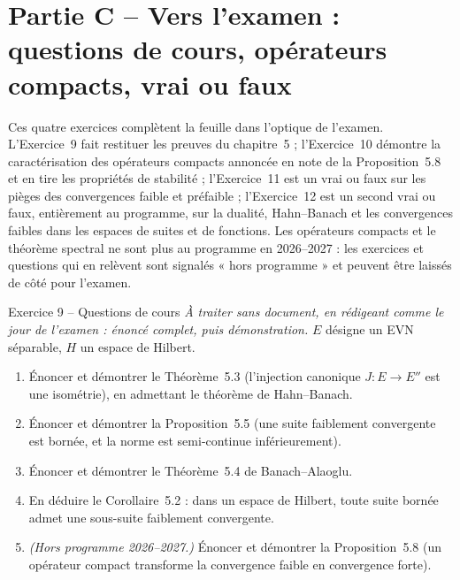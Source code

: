 \documentclass[11pt,a4paper]{article}
\theoremstyle{definition}
\begin{document}
\section*{Partie C -- Vers l'examen : questions de cours, opérateurs compacts, vrai ou faux}

\begin{commentaire}
Ces quatre exercices complètent la feuille dans l'optique de l'examen. L'Exercice~9 fait restituer les preuves du chapitre~5 ; l'Exercice~10 démontre la caractérisation des opérateurs compacts annoncée en note de la Proposition~5.8 et en tire les propriétés de stabilité ; l'Exercice~11 est un vrai ou faux sur les pièges des convergences faible et préfaible ; l'Exercice~12 est un second vrai ou faux, entièrement au programme, sur la dualité, Hahn--Banach et les convergences faibles dans les espaces de suites et de fonctions. Les opérateurs compacts et le théorème spectral ne sont plus au programme en 2026--2027 : les exercices et questions qui en relèvent sont signalés « hors programme » et peuvent être laissés de côté pour l'examen.
\end{commentaire}

\begin{exo}{Exercice 9 -- Questions de cours}
\emph{À traiter sans document, en rédigeant comme le jour de l'examen : énoncé complet, puis démonstration.} $E$ désigne un EVN séparable, $H$ un espace de Hilbert.
\begin{enumerate}[label=(\alph*)]
  \item Énoncer et démontrer le Théorème~5.3 (l'injection canonique $J:E\to E''$ est une isométrie), en admettant le théorème de Hahn--Banach.
  \item Énoncer et démontrer la Proposition~5.5 (une suite faiblement convergente est bornée, et la norme est semi-continue inférieurement).
  \item Énoncer et démontrer le Théorème~5.4 de Banach--Alaoglu.
  \item En déduire le Corollaire~5.2 : dans un espace de Hilbert, toute suite bornée admet une sous-suite faiblement convergente.
  \item \emph{(Hors programme 2026--2027.)} Énoncer et démontrer la Proposition~5.8 (un opérateur compact transforme la convergence faible en convergence forte).
\end{enumerate}
\end{exo}
\end{document}
